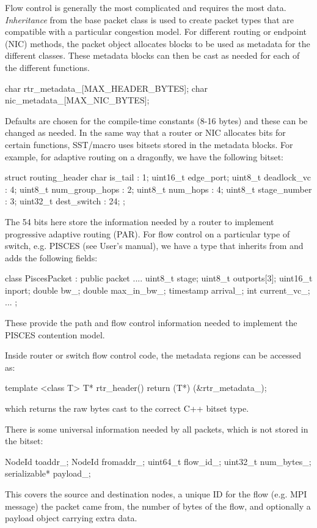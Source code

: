 Flow control is generally the most complicated and requires the most data. 
\emph{Inheritance} from the base packet class is used to create packet types that are compatible with a particular congestion model.
For different routing or endpoint (NIC) methods, the packet object allocates blocks to be used as metadata for the different classes. 
These metadata blocks can then be cast as needed for each of the different functions.

\begin{CppCode}
char rtr_metadata_[MAX_HEADER_BYTES];
char nic_metadata_[MAX_NIC_BYTES];
\end{CppCode}
Defaults are chosen for the compile-time constants (8-16 bytes) and these can be changed as needed.
In the same way that a router or NIC allocates bits for certain functions, SST/macro uses bitsets stored in the metadata blocks.
For example, for adaptive routing on a dragonfly, we have the following bitset:

\begin{CppCode}
struct routing_header  {
 char is_tail : 1;
 uint16_t edge_port; 
 uint8_t deadlock_vc : 4;
 uint8_t num_group_hops : 2;
 uint8_t num_hops : 4;
 uint8_t stage_number : 3;
 uint32_t dest_switch : 24;
};
\end{CppCode}
The 54 bits here store the information needed by a router to implement progressive adaptive routing (PAR). 
For flow control on a particular type of switch, e.g. PISCES (see User's manual), we have a type 
that inherits from  and adds the following fields:

\begin{CppCode}
class PiscesPacket : public packet {
....
uint8_t stage;
uint8_t outports[3];
uint16_t inport;
double bw_;
double max_in_bw_;
timestamp arrival_;
int current_vc_;
...
};
\end{CppCode}
These provide the path and flow control information needed to implement the PISCES contention model.

Inside router or switch flow control code, the metadata regions can be accessed as:
\begin{CppCode}
template <class T>
T* rtr_header()  {
  return (T*) (&rtr_metadata_);
}
\end{CppCode}
which returns the raw bytes cast to the correct C++ bitset type.

There is some universal information needed by all packets, which is not stored in the bitset:

\begin{CppCode}
NodeId toaddr_;
NodeId fromaddr_;
uint64_t flow_id_;
uint32_t num_bytes_;
serializable* payload_;
\end{CppCode}
This covers the source and destination nodes, a unique ID for the flow (e.g. MPI message) the packet came from, the number of bytes of the flow, and optionally a payload object carrying extra data.

